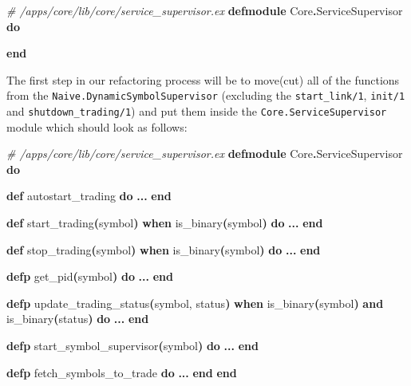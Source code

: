 \documentclass[
  oneside]{book}
\newenvironment{Shaded}{\begin{snugshade}}{\end{snugshade}}
\newcommand{\CommentTok}[1]{\textcolor[rgb]{0.56,0.35,0.01}{\textit{#1}}}
\newcommand{\ConstantTok}[1]{\textcolor[rgb]{0.56,0.35,0.01}{#1}}
\newcommand{\FunctionTok}[1]{\textcolor[rgb]{0.13,0.29,0.53}{\textbf{#1}}}
\newcommand{\KeywordTok}[1]{\textcolor[rgb]{0.13,0.29,0.53}{\textbf{#1}}}
\newcommand{\NormalTok}[1]{#1}
\newcommand{\OperatorTok}[1]{\textcolor[rgb]{0.81,0.36,0.00}{\textbf{#1}}}
\begin{document}
\begin{Shaded}
\begin{Highlighting}[]
\CommentTok{\# /apps/core/lib/core/service\_supervisor.ex}
\KeywordTok{defmodule} \ConstantTok{Core}\OperatorTok{.}\ConstantTok{ServiceSupervisor} \KeywordTok{do}

\KeywordTok{end}
\end{Highlighting}
\end{Shaded}

The first step in our refactoring process will be to move(cut) all of the functions from the \texttt{Naive.DynamicSymbolSupervisor} (excluding the \texttt{start\_link/1}, \texttt{init/1} and \texttt{shutdown\_trading/1}) and put them inside the \texttt{Core.ServiceSupervisor} module which should look as follows:

\begin{Shaded}
\begin{Highlighting}[]
\CommentTok{\# /apps/core/lib/core/service\_supervisor.ex}
\KeywordTok{defmodule} \ConstantTok{Core}\OperatorTok{.}\ConstantTok{ServiceSupervisor} \KeywordTok{do}

  \KeywordTok{def}\NormalTok{ autostart\_trading }\KeywordTok{do}
    \OperatorTok{...}
  \KeywordTok{end}

  \KeywordTok{def}\NormalTok{ start\_trading}\FunctionTok{(}\NormalTok{symbol}\FunctionTok{)} \KeywordTok{when}\NormalTok{ is\_binary}\FunctionTok{(}\NormalTok{symbol}\FunctionTok{)} \KeywordTok{do}
    \OperatorTok{...}
  \KeywordTok{end}

  \KeywordTok{def}\NormalTok{ stop\_trading}\FunctionTok{(}\NormalTok{symbol}\FunctionTok{)} \KeywordTok{when}\NormalTok{ is\_binary}\FunctionTok{(}\NormalTok{symbol}\FunctionTok{)} \KeywordTok{do}
    \OperatorTok{...}
  \KeywordTok{end}

  \KeywordTok{defp}\NormalTok{ get\_pid}\FunctionTok{(}\NormalTok{symbol}\FunctionTok{)} \KeywordTok{do}
    \OperatorTok{...}
  \KeywordTok{end}

  \KeywordTok{defp}\NormalTok{ update\_trading\_status}\FunctionTok{(}\NormalTok{symbol, status}\FunctionTok{)}
       \KeywordTok{when}\NormalTok{ is\_binary}\FunctionTok{(}\NormalTok{symbol}\FunctionTok{)} \KeywordTok{and}\NormalTok{ is\_binary}\FunctionTok{(}\NormalTok{status}\FunctionTok{)} \KeywordTok{do}
    \OperatorTok{...}
  \KeywordTok{end}

  \KeywordTok{defp}\NormalTok{ start\_symbol\_supervisor}\FunctionTok{(}\NormalTok{symbol}\FunctionTok{)} \KeywordTok{do}
    \OperatorTok{...}
  \KeywordTok{end}

  \KeywordTok{defp}\NormalTok{ fetch\_symbols\_to\_trade }\KeywordTok{do}
    \OperatorTok{...}
  \KeywordTok{end}
\KeywordTok{end}
\end{Highlighting}
\end{Shaded}
\end{document}
